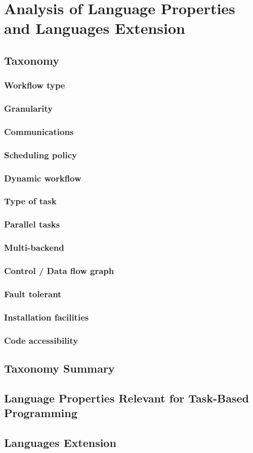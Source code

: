 \chapter{Analysis of Language Properties and Languages Extension}
\label{chap:taxonomy}

\section{Taxonomy}

\subsection{Workflow type}
\subsection{Granularity}
\subsection{Communications}
\subsection{Scheduling policy}
\subsection{Dynamic workflow}
\subsection{Type of task}
\subsection{Parallel tasks}
\subsection{Multi-backend}
\subsection{Control / Data flow graph}
\subsection{Fault tolerant}
\subsection{Installation facilities}
\subsection{Code accessibility}

\section{Taxonomy Summary}

\section{Language Properties Relevant for Task-Based Programming}

\section{Languages Extension}